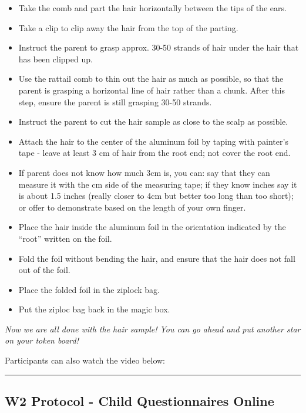 \documentclass[]{book}
\begin{document}
\begin{itemize}
\item
  Take the comb and part the hair horizontally between the tips of the ears.
\item
  Take a clip to clip away the hair from the top of the parting.
\item
  Instruct the parent to grasp approx. 30-50 strands of hair under the hair that has been clipped up.
\item
  Use the rattail comb to thin out the hair as much as possible, so that the parent is grasping a horizontal line of hair rather than a chunk. After this step, ensure the parent is still grasping 30-50 strands.
\item
  Instruct the parent to cut the hair sample as close to the scalp as possible.
\item
  Attach the hair to the center of the aluminum foil by taping with painter's tape - leave at least 3 cm of hair from the root end; not cover the root end.
\item
  If parent does not know how much 3cm is, you can: say that they can measure it with the cm side of the measuring tape; if they know inches say it is about 1.5 inches (really closer to 4cm but better too long than too short); or offer to demonstrate based on the length of your own finger.
\item
  Place the hair inside the aluminum foil in the orientation indicated by the ``root'' written on the foil.
\item
  Fold the foil without bending the hair, and ensure that the hair does not fall out of the foil.
\item
  Place the folded foil in the ziplock bag.
\item
  Put the ziploc bag back in the magic box.
\end{itemize}

\emph{Now we are all done with the hair sample! You can go ahead and put another star on your token board!}

Participants can also watch the video below:

\begin{center}\rule{0.5\linewidth}{0.5pt}\end{center}

\hypertarget{w2-protocol---child-questionnaires-online}{%
\subsection{W2 Protocol - Child Questionnaires Online}\label{w2-protocol---child-questionnaires-online}}
\end{document}
